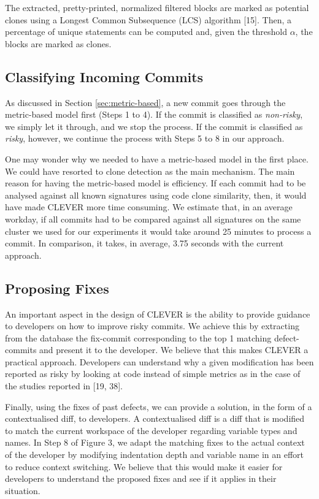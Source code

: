\documentclass[sigconf]{acmart}
\begin{document}


The extracted, pretty-printed, normalized filtered blocks are marked as
potential clones using a Longest Common Subsequence (LCS) algorithm
[15]. Then, a percentage of unique statements can be computed and,
given the threshold \(\alpha\), the blocks are marked as clones.

\subsection{Classifying Incoming
Commits}\label{classifying-incoming-commits}

As discussed in Section \ref{sec:metric-based}, a new commit goes
through the metric-based model first (Steps 1 to 4). If the commit is
classified as \emph{non-risky}, we simply let it through, and we stop
the process. If the commit is classified as \emph{risky}, however, we
continue the process with Steps 5 to 8 in our approach.

One may wonder why we needed to have a metric-based model in the first
place. We could have resorted to clone detection as the main mechanism.
The main reason for having the metric-based model is efficiency. If each
commit had to be analysed against all known signatures using code clone
similarity, then, it would have made CLEVER more time consuming. We
estimate that, in an average workday, if all commits had to be compared
against all signatures on the same cluster we used for our experiments
it would take around 25 minutes to process a commit. In comparison, it
takes, in average, 3.75 seconds with the current approach.

\subsection{Proposing Fixes}\label{proposing-fixes}

An important aspect in the design of CLEVER is the ability to provide
guidance to developers on how to improve risky commits. We achieve this
by extracting from the database the fix-commit corresponding to the top
1 matching defect-commits and present it to the developer. We believe
that this makes CLEVER a practical approach. Developers can understand
why a given modification has been reported as risky by looking at code
instead of simple metrics as in the case of the studies reported in
[19, 38].

Finally, using the fixes of past defects, we can provide a solution, in
the form of a contextualised diff, to developers. A contextualised diff
is a diff that is modified to match the current workspace of the
developer regarding variable types and names. In Step 8 of Figure 3, we
adapt the matching fixes to the actual context of the developer by
modifying indentation depth and variable name in an effort to reduce
context switching. We believe that this would make it easier for
developers to understand the proposed fixes and see if it applies in
their situation.
\end{document}

